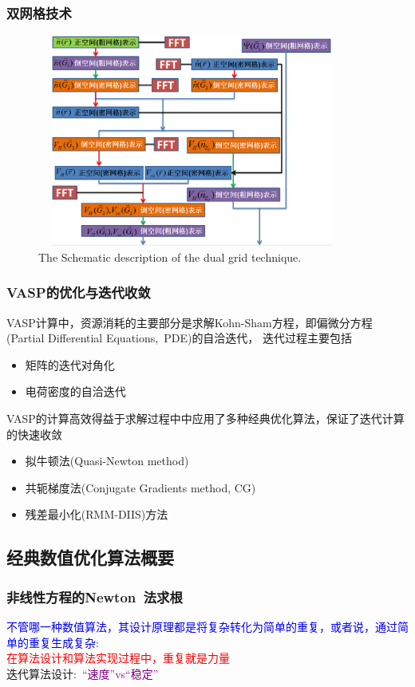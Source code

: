 \frame
{
	\frametitle{双网格技术}
\begin{figure}[h!]
	\vspace{-0.15in}
\centering
\includegraphics[height=2.75in,width=4.0in,viewport=0 0 800 600,clip]{Figures/dual_grid-2.png}
\caption{\tiny \textrm{The Schematic description of the dual grid technique.}}%
\label{PAW_dualgrid}
\end{figure} 
}

\frame
{
	\frametitle{\textrm{VASP}的优化与迭代收敛}
	\textrm{VASP}计算中，资源消耗的主要部分是求解\textrm{Kohn-Sham}方程，即偏微分方程\textrm{(Partial Differential Equations,~PDE)}的自洽迭代， 迭代过程主要包括
	\begin{itemize}
		\item 矩阵的迭代对角化
		\item 电荷密度的自洽迭代
	\end{itemize}

	\vskip 10pt
	\textrm{VASP}的计算高效得益于求解过程中中应用了多种经典优化算法，保证了迭代计算的快速收敛
	\begin{itemize} 
		\item 拟牛顿法\textrm{(Quasi-Newton method)}
		\item 共轭梯度法\textrm{(Conjugate Gradients method, CG)}
		\item 残差最小化\textrm{(RMM-DIIS)}方法
	\end{itemize}
}

\subsection{经典数值优化算法概要}
\frame
{
	\frametitle{非线性方程的\rm{Newton~}法求根}
	\textcolor{blue}{不管哪一种数值算法，其设计原理都是将复杂转化为简单的重复，或者说，通过简单的重复生成复杂}:\\
	\textcolor{red}{在算法设计和算法实现过程中，重复就是力量}\\
迭代算法设计:~\textcolor{purple}{“速度”\textrm{vs}“稳定”}
\begin{figure}[h!]
\centering
{}
\label{Equation_Newon}
\end{figure}
}

